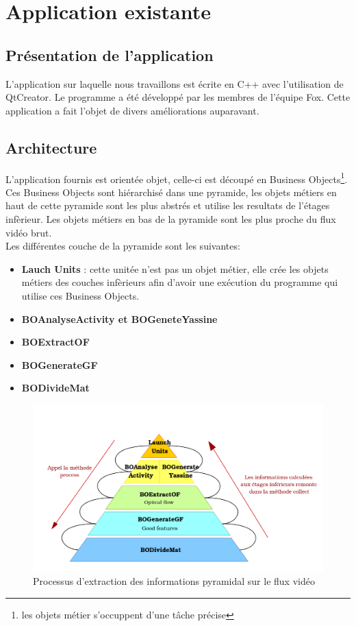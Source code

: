 \section{Application existante}

\subsection{Présentation de l'application}
L'application sur laquelle nous travaillons est écrite en C++ avec l'utilisation de QtCreator. Le 
programme a été développé par les membres de l'équipe Fox. Cette application a fait 
l'objet de divers améliorations auparavant.\\

\subsection{Architecture}
L'application fournis est orientée objet, celle-ci est découpé en Business Objects\footnote{les objets 
métier s'occuppent d'une tâche précise}. Ces Business Objects sont hiérarchisé dans une pyramide, les 
objets métiers en haut de cette pyramide sont les plus abstrés et utilise les resultats de l'étages infèrieur. 
Les objets métiers en bas de la pyramide sont les plus proche du flux vidéo brut.\\

Les différentes couche de la pyramide sont les suivantes:
\begin{itemize}
 \item \textbf{Lauch Units} : cette unitée n'est pas un objet métier, elle crée les objets métiers des 
 couches infèrieurs afin d'avoir une exécution du programme qui utilise ces Business Objects.
 \item \textbf{BOAnalyseActivity et BOGeneteYassine}
 \item \textbf{BOExtractOF}
 \item \textbf{BOGenerateGF}
 \item \textbf{BODivideMat}
\end{itemize}


\begin{figure}[H]
  \centering
  \includegraphics[width=13cm]{image/pyramide.png}
  \caption{Processus d'extraction des informations pyramidal sur le flux vidéo}
\end{figure}

